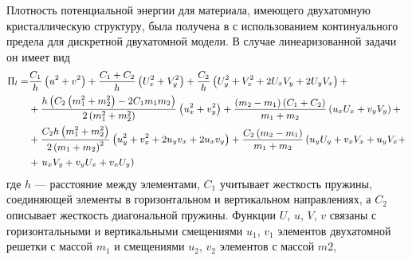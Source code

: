 
Плотность потенциальной энергии для материала, имеющего двухатомную кристаллическую структуру, была получена в \cite{bound_porsp17} с использованием континуального предела для дискретной двухатомной модели. В случае линеаризованной задачи он имеет вид
\begin{equation}
\begin{small} 
	\begin{aligned}
		\Pi_l = & \frac{C_1}{h} \left(u^2 + v^2\right) + \frac{C_1+C_2}{h}\left(U_x^2+V_y^2\right) +\frac{C_2}{h}\left(U_y^2 + V_x^2 + 2U_x V_y + 2 U_y V_x\right) + \\ 
		& + \frac{h\left(C_2\left(m_1^2 + m_2^2\right) - 2C_1 m_1 m_2\right)}{2\left(m_1^2 + m_2^2\right)}\left(u_x^2 + v_y^2\right) + \frac{\left(m_2-m_1\right)\left(C_1+C_2\right)}{m_1+m_2}\left(u_x U_x + v_y V_y\right) + \\ 
		& + \frac{C_2 h\left(m_1^2+m_2^2\right)}{2\left(m_1+m_2\right)^2}\left(u_y^2+v_x^2+2u_y v_x + 2u_x v_y\right) + \frac{C_2\left(m_2 - m_1\right)}{m_1 + m_2}\left(u_y U_y+v_x V_x + u_y V_x + \right. \\
		& + \left. u_x V_y + v_y U_x + v_x U_y\right)
	\end{aligned}
\end{small}
\end{equation}
где $h$ --- расстояние между элементами, $C_1$ учитывает жесткость пружины, соединяющей элементы в горизонтальном и вертикальном направлениях, а $C_2$ описывает жесткость диагональной пружины. Функции $U$, $u$, $V$, $v$ связаны с горизонтальными и вертикальными смещениями $u_1$, $v_1$ элементов двухатомной решетки с массой $m_1$ и смещениями $u_2$, $v_2$ элементов с массой $m2$,

